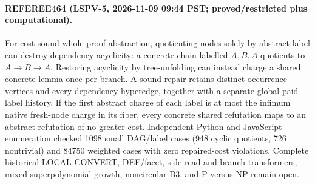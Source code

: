 \paragraph{REFEREE464 (LSPV-5, 2026-11-09 09:44 PST; proved/restricted plus computational).}
For cost-sound whole-proof abstraction, quotienting nodes solely by abstract
label can destroy dependency acyclicity: a concrete chain labelled
$A,B,A$ quotients to $A\to B\to A$.  Restoring acyclicity by
tree-unfolding can instead charge a shared concrete lemma once per branch.
A sound repair retains distinct occurrence vertices and every dependency
hyperedge, together with a separate global paid-label history.  If the first
abstract charge of each label is at most the infimum native fresh-node charge
in its fiber, every concrete shared refutation maps to an abstract refutation
of no greater cost.  Independent Python and JavaScript enumeration checked
1098 small DAG/label cases (948 cyclic quotients, 726 nontrivial) and 84750
weighted cases with zero repaired-cost violations.  Complete historical
LOCAL-CONVERT, DEF/facet, side-read and branch transformers, mixed
superpolynomial growth, noncircular B3, and P versus NP remain open.
